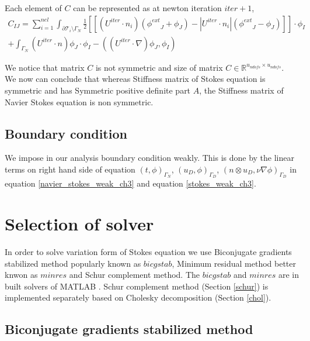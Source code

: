 \documentclass[a4paper,12pt]{book}
\begin{document}
Each element of $C$ can be represented as at newton iteration $iter + 1$,
\begin{equation} \label{matric C}
\begin{split}
C_{IJ} = \sum_{i=1}^{nel} \int_{\partial \mathcal{T}_i \setminus \Gamma_N} \frac{1}{2} [[(U^{iter} \cdot n_i)({\phi^{ext}}_J + {\phi}_J ) - |U^{iter} \cdot n_i|({{\phi}^{ext}}_J - {\phi}_J)]] \cdot \phi_I \\ + \int_{\Gamma_N} (U^{iter} \cdot n) \phi_J \cdot \phi_I -((U^{iter} \cdot \nabla)\phi_J,\phi_I)
\end{split}
\end{equation}

We notice that matrix $C$ is not symmetric and size of matrix $C \in \mathbb{R}^{u_{ndofs} \times u_{ndofs}}$. \\

We now can conclude that whereas Stiffness matrix of Stokes equation is symmetric and has Symmetric positive definite part $A$, the Stiffness matrix of Navier Stokes equation is non symmetric.

\subsection{Boundary condition}

We impose in our analysis boundary condition weakly. This is done by the linear terms on right hand side of equation  $(t,\phi)_{\Gamma_N}$, $(u_D,\phi)_{\Gamma_D}$, $(n \otimes u_D, \nu \nabla \phi)_{\Gamma_D}$ in equation \ref{navier_stokes_weak_ch3} and equation \ref{stokes_weak_ch3}.

\section{Selection of solver}

In order to solve variation form of Stokes equation we use Biconjugate gradients stabilized method popularly known as $bicgstab$, Minimum residual method better knwon as $minres$ and Schur complement method. The $bicgstab$ and $minres$ are in built solvers of MATLAB \cite{matlab}. Schur complement method (Section \ref{schur}) is implemented separately based on Cholesky decomposition (Section \ref{chol}).

\subsection{Biconjugate gradients stabilized method}
\end{document}
